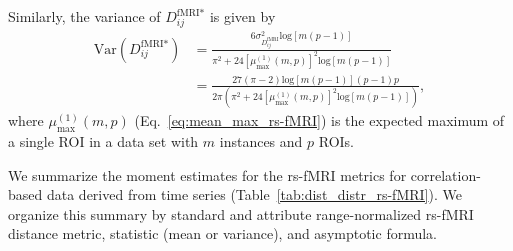 \documentclass[aos]{imsart}
\begin{document}
Similarly, the variance of $D^\text{fMRI*}_{ij}$ is given by
%
\begin{equation}\label{eq:var_max-min_rs-fMRI}
\begin{aligned}
\text{Var}\left(D^\text{fMRI*}_{ij}\right) &= \frac{6\sigma^2_{D^\text{fMRI}_{ij}}\text{log}[m(p-1)]}{\pi^2 + 24\left[\mu^{(1)}_\text{max}(m,p)\right]^2\text{log}[m(p-1)]} \\
&= \frac{27(\pi-2)\text{log}[m(p-1)](p-1)p}{2\pi\left(\pi^2 + 24\left[\mu^{(1)}_\text{max}(m,p)\right]^2\text{log}[m(p-1)]\right)},
\end{aligned}
\end{equation}
%
where $\mu^{(1)}_\text{max}(m,p)$ (Eq.~\ref{eq:mean_max_rs-fMRI}) is the expected maximum of a single ROI in a data set with $m$ instances and $p$ ROIs.

We summarize the moment estimates for the rs-fMRI metrics for correlation-based data derived from time series (Table~\ref{tab:dist_distr_rs-fMRI}). We organize this summary by standard and attribute range-normalized rs-fMRI distance metric, statistic (mean or variance), and asymptotic formula.
\end{document}
